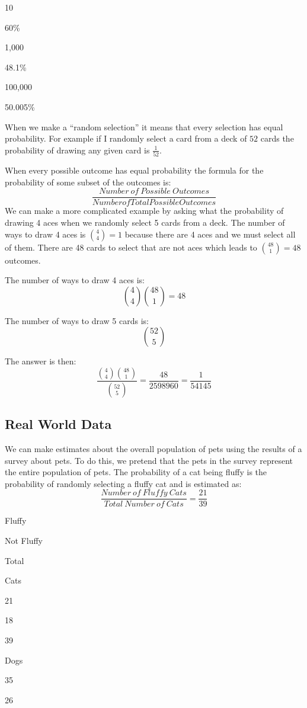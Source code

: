 \documentclass[]{book}
\begin{document}
10

60\%

1,000

48.1\%

100,000

50.005\%

When we make a ``random selection'' it means that every selection has
equal probability. For example if I randomly select a card from a deck
of \(52\) cards the probability of drawing any given card is
\(\frac{1}{52}\).

When every possible outcome has equal probability the formula for the
probability of some subset of the outcomes is:
\[\frac{Number \ of \ Possible \ Outcomes}{Number of Total Possible Outcomes}\]
We can make a more complicated example by asking what the probability of
drawing 4 aces when we randomly select 5 cards from a deck. The number
of ways to draw 4 aces is \({4 \choose 4} = 1\) because there are 4 aces
and we must select all of them. There are 48 cards to select that are
not aces which leads to \({48 \choose 1} = 48\) outcomes.

The number of ways to draw 4 aces is:
\[{4 \choose 4}{48 \choose 1} = 48\]

The number of ways to draw 5 cards is: \[{52 \choose 5}\]

The answer is then:
\[\frac{{4 \choose 4}{48 \choose 1}}{{52 \choose 5}} = \frac{48}{2598960} = \frac{1}{54145}\]

\subsection{Real World Data}\label{real-world-data}

We can make estimates about the overall population of pets using the
results of a survey about pets. To do this, we pretend that the pets in
the survey represent the entire population of pets. The probability of a
cat being fluffy is the probability of randomly selecting a fluffy cat
and is estimated as:
\[\frac{Number \ of \ Fluffy \ Cats}{Total \ Number \ of \ Cats}=\frac{21}{39}\]

Fluffy

Not Fluffy

Total

Cats

21

18

39

Dogs

35

26
\end{document}
